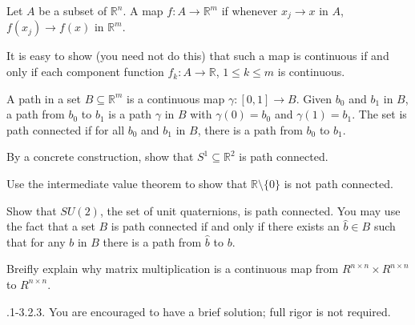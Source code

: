 \documentclass[minion]{homework}
\newcommand{\Reals}{\mathbb{R}}
\begin{document}
\begin{problems}
Let $A$ be a subset of $\Reals^n$. A map $f:A\to \Reals^m$ if
whenever $x_j\to x$ in $A$, $f(x_j)\to f(x)$ in $\Reals^m$.

It is easy to show (you need not do this) that such a map
is continuous if and only if each component function $f_k:A\to
\Reals$, $1\le k\le m$ is continuous.

A path in a set $B\subseteq \Reals^m$ is a continuous map
$\gamma:[0,1]\to B$.  Given $b_0$ and $b_1$ in $B$, a path
from $b_0$ to $b_1$ is a path $\gamma$ in $B$ 
with $\gamma(0)=b_0$ and $\gamma(1)=b_1$.  The set is path connected if for all
$b_0$ and $b_1$ in $B$, there is a path from $b_0$ to $b_1$.

\problem By a concrete construction, show that $S^1\subseteq \Reals^2$ is
path connected.

\problem Use the intermediate value theorem to show that $\Reals\setminus\{0\}$
is not path connected.

\problem Show that $SU(2)$, the set of unit quaternions, 
is path connected.  You may use the fact that
a set $B$ is path connected if and only if there exists an $\hat b\in B$
such that for any $b$ in $B$ there is a path from $\hat b$ to $b$.

\problem Breifly explain why matrix multiplication is a continuous map from
$R^{n\times n}\times R^{n\times n}$ to $R^{n\times n}$.

.1-3.2.3.  You are encouraged to have a brief solution; full
rigor is not required.

\end{problems}
\end{document}
